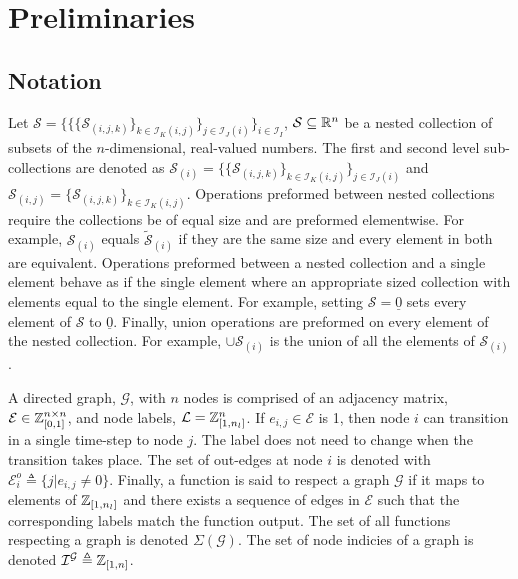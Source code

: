 \section{Preliminaries}
\subsection{Notation}
Let $\mathcal{S}=\{\{\{\mathcal{S}_{(i,j,k)}\}_{k\in\mathcal{I}_{K}(i,j)}\}_{j\in\mathcal{I}_{J}(i)}\}_{i\in\mathcal{I}_I}$, $\mathcal{S}\subseteq\mathbb{R}^n$ be a nested collection of subsets of the $n$-dimensional, real-valued numbers. The first and second level sub-collections are denoted as $\mathcal{S}_{(i)}=\{\{\mathcal{S}_{(i,j,k)}\}_{k\in\mathcal{I}_{K}(i,j)}\}_{j\in\mathcal{I}_{J}(i)}$ and $\mathcal{S}_{(i,j)}=\{\mathcal{S}_{(i,j,k)}\}_{k\in\mathcal{I}_{K}(i,j)}$. Operations preformed between nested collections require the collections be of equal size and are preformed elementwise. For example, $\mathcal{S}_{(i)}$ equals $\tilde{\mathcal{S}}_{(i)}$ if they are the same size and every element in both are equivalent. Operations preformed between a nested collection and a single element behave as if the single element where an appropriate sized collection with elements equal to the single element. For example, setting $\mathcal{S}=\underline{0}$ sets every element of $\mathcal{S}$ to $\underline{0}$. Finally, union operations are preformed on every element of the nested collection. For example, $\cup \mathcal{S}_{(i)}$ is the union of all the elements of $\mathcal{S}_{(i)}$.

A directed graph, $\mathcal{G}$, with $n$ nodes is comprised of an adjacency matrix, $\mathcal{E}\in\mathbb{Z}_{[0,1]}^{n\times n}$, and node labels, $\mathcal{L}=\mathbb{Z}_{[1,n_l]}^n$. If $e_{i,j}\in\mathcal{E}$ is 1, then node $i$ can transition in a single time-step to node $j$. The label does not need to change when the transition takes place. The set of out-edges at node $i$ is denoted with $\mathcal{E}^o_i\triangleq\{j|e_{i,j}\neq 0\}$. Finally, a function is said to respect a graph $\mathcal{G}$ if it maps to elements of $\mathbb{Z}_{[1,n_l]}$ and there exists a sequence of edges in $\mathcal{E}$ such that the corresponding labels match the function output. The set of all functions respecting a graph is denoted $\Sigma(\mathcal{G})$. The set of node indicies of a graph is denoted $\mathcal{I}^\mathcal{G}\triangleq\mathbb{Z}_{[1,n]}$.

